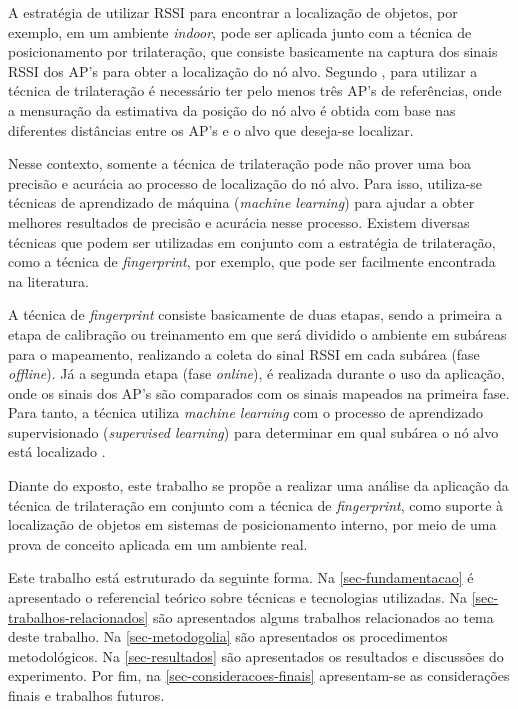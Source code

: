 \documentclass[12pt]{artigoifce}
\begin{document}
A estratégia de utilizar RSSI para encontrar a localização de objetos, por exemplo, em um ambiente \textit{indoor}, pode ser aplicada junto com a técnica de posicionamento por trilateração, que consiste basicamente na captura dos sinais RSSI dos AP's para obter a localização do nó alvo. Segundo , para utilizar a técnica de trilateração é necessário ter pelo menos três AP's de referências, onde a mensuração da estimativa da posição do nó alvo é obtida com base nas diferentes distâncias entre os AP's e o alvo que deseja-se localizar.

Nesse contexto, somente a técnica de trilateração pode não prover uma boa precisão e acurácia ao processo de localização do nó alvo. Para isso, utiliza-se técnicas de aprendizado de máquina (\textit{machine learning}) para ajudar a obter melhores resultados de precisão e acurácia nesse processo. Existem diversas técnicas que podem ser utilizadas em conjunto com a estratégia de trilateração, como a técnica de \textit{fingerprint}, por exemplo, que pode ser facilmente encontrada na literatura.

A técnica de \textit{fingerprint} consiste basicamente de duas etapas, sendo a primeira a etapa de calibração ou treinamento em que será dividido o ambiente em subáreas para o mapeamento, realizando a coleta do sinal RSSI em cada subárea (fase \textit{offline}). Já a segunda etapa (fase \textit{online}), é realizada durante o uso da aplicação, onde os sinais dos AP's são comparados com os sinais mapeados na primeira fase. Para tanto, a técnica utiliza \textit{machine learning} com o processo de aprendizado supervisionado (\textit{supervised learning}) para determinar em qual subárea o nó alvo está localizado \cite{krause2018}.

Diante do exposto, este trabalho se propõe a realizar uma análise da aplicação da técnica de trilateração em conjunto com a técnica de \textit{fingerprint}, como suporte à localização de objetos em sistemas de posicionamento interno, por meio de uma prova de conceito aplicada em um ambiente real.

Este trabalho está estruturado da seguinte forma. Na \autoref{sec-fundamentacao} é apresentado o referencial teórico sobre técnicas e tecnologias utilizadas. Na \autoref{sec-trabalhos-relacionados} são apresentados alguns trabalhos relacionados ao tema deste trabalho. Na \autoref{sec-metodogolia} são apresentados os procedimentos metodológicos. Na \autoref{sec-resultados} são apresentados os resultados e discussões do experimento. Por fim, na \autoref{sec-consideracoes-finais} apresentam-se as considerações finais e trabalhos futuros.
\end{document}
